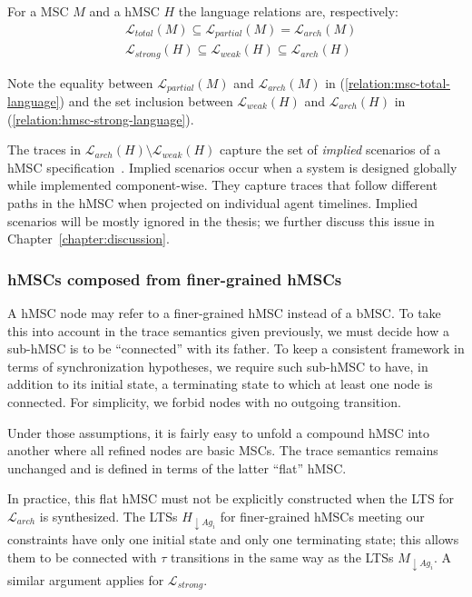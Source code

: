 \noindent For a MSC $M$ and a hMSC $H$ the language relations are, respectively:
\begin{align}
&\mathcal{L}_{total}(M) \subseteq \mathcal{L}_{partial}(M) = \mathcal{L}_{arch}(M) \label{relation:msc-total-language}\\
&\mathcal{L}_{strong}(H) \subseteq \mathcal{L}_{weak}(H) \subseteq \mathcal{L}_{arch}(H) \label{relation:hmsc-strong-language}
\end{align}

Note the equality between $\mathcal{L}_{partial}(M)$ and $\mathcal{L}_{arch}(M)$ in (\ref{relation:msc-total-language}) and the set inclusion between $\mathcal{L}_{weak}(H)$ and $\mathcal{L}_{arch}(H)$ in (\ref{relation:hmsc-strong-language}). 

The traces in $\mathcal{L}_{arch}(H) \setminus \mathcal{L}_{weak}(H)$ capture the set of \emph{implied} scenarios of a hMSC specification~\cite{Alur:2000, Uchitel:2004}. Implied scenarios occur when a system is designed globally while implemented component-wise. They capture traces that follow different paths in the hMSC when projected on individual agent timelines. Implied scenarios will be mostly ignored in the thesis; we further discuss this issue in Chapter~\ref{chapter:discussion}.

\subsubsection*{hMSCs composed from finer-grained hMSCs\label{subsubsection:hMSC-with-sub-hMSC}}

A hMSC node may refer to a finer-grained hMSC instead of a bMSC. To take this into account in the trace semantics given previously, we must decide how a sub-hMSC is to be ``connected'' with its father. To keep a consistent framework in terms of synchronization hypotheses, we require such sub-hMSC to have, in addition to its initial state, a terminating state to which at least one node is connected. For simplicity, we forbid nodes with no outgoing transition. 

Under those assumptions, it is fairly easy to unfold a compound hMSC into another where all refined nodes are basic MSCs. The trace semantics remains unchanged and is defined in terms of the latter ``flat'' hMSC. 

In practice, this flat hMSC must not be explicitly constructed when the LTS for $\mathcal{L}_{arch}$ is synthesized. The LTSs $H_{\downarrow Ag_i}$ for finer-grained hMSCs meeting our constraints have only one initial state and only one terminating state; this allows them to be connected with $\tau$ transitions in the same way as the LTSs $M_{\downarrow Ag_i}$. A similar argument applies for $\mathcal{L}_{strong}$.

